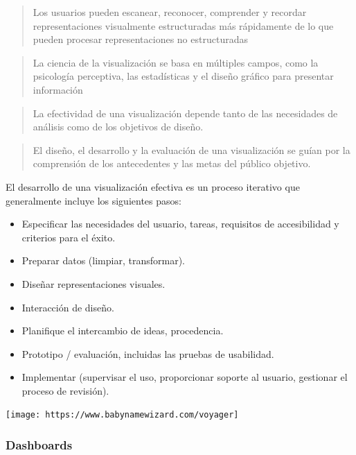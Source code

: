 \documentclass[
]{book}
\providecommand{\tightlist}{%
  \setlength{\itemsep}{0pt}\setlength{\parskip}{0pt}}
\begin{document}
\begin{quote}
Los usuarios pueden escanear, reconocer, comprender y recordar representaciones visualmente estructuradas más rápidamente de lo que pueden procesar representaciones no estructuradas
\end{quote}

\begin{quote}
La ciencia de la visualización se basa en múltiples campos, como la psicología perceptiva, las estadísticas y el diseño gráfico para presentar información
\end{quote}

\begin{quote}
La efectividad de una visualización depende tanto de las necesidades de análisis como de los objetivos de diseño.
\end{quote}

\begin{quote}
El diseño, el desarrollo y la evaluación de una visualización se guían por la comprensión de los antecedentes y las metas del público objetivo.
\end{quote}

El desarrollo de una visualización efectiva es un proceso iterativo que generalmente incluye los siguientes pasos:

\begin{itemize}
\tightlist
\item
  Especificar las necesidades del usuario, tareas, requisitos de accesibilidad y criterios para el éxito.
\item
  Preparar datos (limpiar, transformar).
\item
  Diseñar representaciones visuales.
\item
  Interacción de diseño.
\item
  Planifique el intercambio de ideas, procedencia.
\item
  Prototipo / evaluación, incluidas las pruebas de usabilidad.
\item
  Implementar (supervisar el uso, proporcionar soporte al usuario, gestionar el proceso de revisión).
\end{itemize}

\texttt{[image: https://www.babynamewizard.com/voyager]}

\hypertarget{dashboards}{%
\subsubsection{Dashboards}\label{dashboards}}
\end{document}
